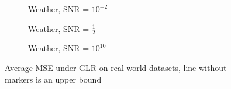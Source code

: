 {\begin{figure}
\begin{subfigure}{0.3\columnwidth}
    \caption{Weather, SNR = $10^{-2}$}
    \label{weather_GLR_MSE_subfiga}
    \end{subfigure}\hfill
    \begin{subfigure}{0.3\columnwidth}
    \caption{Weather, SNR = $\frac{1}{2}$}%
    \label{weather_GLR_MSE_subfigb}%
    \end{subfigure}\hfill%
    \begin{subfigure}{0.3\columnwidth}
    \caption{Weather, SNR = $10^{10}$}%
    \label{weather_GLR_MSE_subfigc}%
    \end{subfigure}%
    \caption{Average MSE under GLR on real world datasets, line without markers is an upper bound}
\label{GLR_real_MSE_fig}
\end{figure}

}
